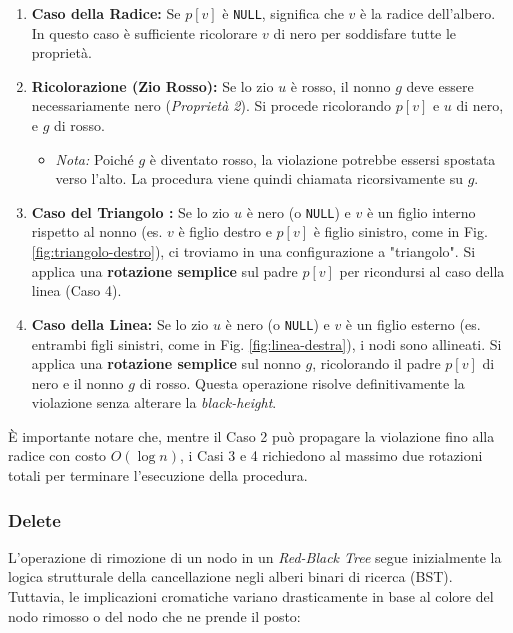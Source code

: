 \begin{enumerate}
    \item \textbf{Caso della Radice:} Se $p[v]$ è \texttt{NULL}, significa che $v$ è la radice dell'albero. In questo caso è sufficiente ricolorare $v$ di nero per soddisfare tutte le proprietà.
    
    \item \textbf{Ricolorazione (Zio Rosso):} Se lo zio $u$ è rosso, il nonno $g$ deve essere necessariamente nero (\textit{Proprietà 2}). Si procede ricolorando $p[v]$ e $u$ di nero, e $g$ di rosso. 
    \begin{itemize}
        \item \textit{Nota:} Poiché $g$ è diventato rosso, la violazione potrebbe essersi spostata verso l'alto. La procedura viene quindi chiamata ricorsivamente su $g$.
    \end{itemize}

    \item \textbf{Caso del Triangolo :} Se lo zio $u$ è nero (o \texttt{NULL}) e $v$ è un figlio interno rispetto al nonno (es. $v$ è figlio destro e $p[v]$ è figlio sinistro, come in Fig. \ref{fig:triangolo-destro}), ci troviamo in una configurazione a "triangolo". 
    Si applica una \textbf{rotazione semplice} sul padre $p[v]$ per ricondursi al caso della linea (Caso 4).

    \item \textbf{Caso della Linea:} Se lo zio $u$ è nero (o \texttt{NULL}) e $v$ è un figlio esterno (es. entrambi figli sinistri, come in Fig. \ref{fig:linea-destra}), i nodi sono allineati. 
    Si applica una \textbf{rotazione semplice} sul nonno $g$, ricolorando il padre $p[v]$ di nero e il nonno $g$ di rosso. Questa operazione risolve definitivamente la violazione senza alterare la \textit{black-height}.
\end{enumerate}

\begin{remark}
    È importante notare che, mentre il Caso 2 può propagare la violazione fino alla radice con costo $O(\log n)$, i Casi 3 e 4 richiedono al massimo due rotazioni totali per terminare l'esecuzione della procedura.
\end{remark}

\subsubsection{Delete}
L'operazione di rimozione di un nodo in un \textit{Red-Black Tree} segue inizialmente la logica strutturale della cancellazione negli alberi binari di ricerca (BST). Tuttavia, le implicazioni cromatiche variano drasticamente in base al colore del nodo rimosso o del nodo che ne prende il posto:

